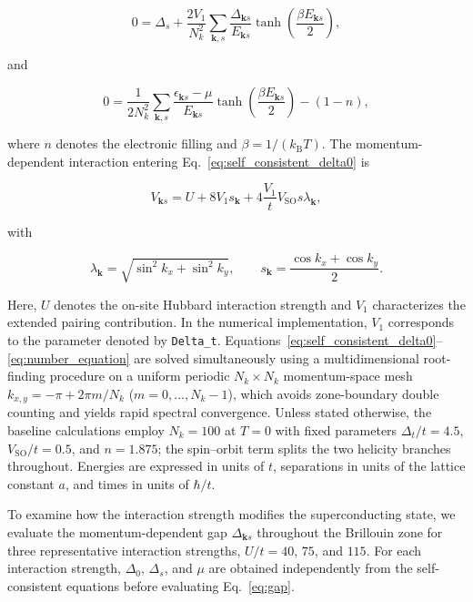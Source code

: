 \documentclass[aps,prb,twocolumn,superscriptaddress,longbibliography]{revtex4-2}
\begin{document}
\begin{equation}\boxed{
0
=
\Delta_s
+
\frac{2V_1}{N_k^2}
\sum_{\mathbf{k},s}
\frac{\Delta_{\mathbf{k}s}}
{E_{\mathbf{k}s}}
\tanh
\left(
\frac{\beta E_{\mathbf{k}s}}{2}
\right),
}\label{eq:self_consistent_deltas}\end{equation}

and

\begin{equation}\boxed{
0
=
\frac{1}{2N_k^2}
\sum_{\mathbf{k},s}
\frac{\epsilon_{\mathbf{k}s}-\mu}
{E_{\mathbf{k}s}}
\tanh
\left(
\frac{\beta E_{\mathbf{k}s}}{2}
\right)
-
(1-n),
}\label{eq:number_equation}\end{equation}

where $n$ denotes the electronic filling and
$\beta=1/(k_{\mathrm B}T)$. The momentum-dependent interaction entering
Eq.~\eqref{eq:self_consistent_delta0} is

\begin{equation}\boxed{
V_{\mathbf{k}s}
=
U
+
8V_1 s_{\mathbf{k}}
+
4\frac{V_1}{t}
V_{\mathrm{SO}}s\lambda_{\mathbf{k}},
}\label{eq:interaction}\end{equation}

with

\begin{equation}\boxed{
\lambda_{\mathbf{k}}
=
\sqrt{\sin^2 k_x+\sin^2 k_y},
\qquad
s_{\mathbf{k}}
=
\frac{\cos k_x+\cos k_y}{2}.
}\label{eq:lambda_sk}\end{equation}

Here, $U$ denotes the on-site Hubbard interaction strength and $V_1$ characterizes
the extended pairing contribution. In the numerical implementation,
$V_1$ corresponds to the parameter denoted by \texttt{Delta\_t}.
Equations~\eqref{eq:self_consistent_delta0}--\eqref{eq:number_equation}
are solved simultaneously using a multidimensional root-finding procedure on a
uniform periodic $N_k\times N_k$ momentum-space mesh
$k_{x,y}=-\pi+2\pi m/N_k$ ($m=0,\ldots,N_k-1$), which avoids
zone-boundary double counting and yields rapid spectral convergence.
Unless stated otherwise, the baseline calculations employ $N_k=100$ at $T=0$
with fixed parameters $\Delta_t/t=4.5$, $V_{\mathrm{SO}}/t=0.5$, and
$n=1.875$; the spin--orbit term splits the two helicity branches throughout.
Energies are expressed in units of $t$, separations in units of the lattice
constant $a$, and times in units of $\hbar/t$.

To examine how the interaction strength modifies the superconducting state,
we evaluate the momentum-dependent gap $\Delta_{\mathbf{k}s}$ throughout
the Brillouin zone for three representative interaction strengths,
$U/t=40$, $75$, and $115$. For each interaction strength,
$\Delta_0$, $\Delta_s$, and $\mu$ are obtained independently from the
self-consistent equations before evaluating Eq.~\eqref{eq:gap}.
\end{document}
